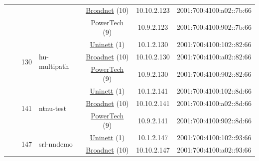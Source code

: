 \begin{small}
\begin{center}
\begin{longtable}{|c|c|c|c|c|c|c|c|}
  &  &  &  & \multicolumn{2}{|c|}{\tiny{\href{https://www.broadnet.no}{Broadnet} (10)}} & \tiny{10.10.2.123} & \tiny{2001:700:4100:a02::7b:66} \\* \cline{5-5}\cline{6-6}\cline{7-7}\cline{8-8}
  &  &  &  & \multicolumn{2}{|c|}{\tiny{\href{http://www.powertech.no}{PowerTech} (9)}} & \tiny{10.9.2.123} & \tiny{2001:700:4100:902::7b:66} \\* \cline{3-3}\cline{4-4}\cline{5-5}\cline{6-6}\cline{7-7}\cline{8-8}
  &  & \multirow{3}{*}{\tiny{130}} & \multicolumn{1}{|l|}{\multirow{3}{*}{\tiny{hu-multipath}}} & \multicolumn{2}{|c|}{\tiny{\href{https://www.uninett.no}{Uninett} (1)}} & \tiny{10.1.2.130} & \tiny{2001:700:4100:102::82:66} \\* \cline{5-5}\cline{6-6}\cline{7-7}\cline{8-8}
  &  &  &  & \multicolumn{2}{|c|}{\tiny{\href{https://www.broadnet.no}{Broadnet} (10)}} & \tiny{10.10.2.130} & \tiny{2001:700:4100:a02::82:66} \\* \cline{5-5}\cline{6-6}\cline{7-7}\cline{8-8}
  &  &  &  & \multicolumn{2}{|c|}{\tiny{\href{http://www.powertech.no}{PowerTech} (9)}} & \tiny{10.9.2.130} & \tiny{2001:700:4100:902::82:66} \\* \cline{3-3}\cline{4-4}\cline{5-5}\cline{6-6}\cline{7-7}\cline{8-8}
  &  & \multirow{3}{*}{\tiny{141}} & \multicolumn{1}{|l|}{\multirow{3}{*}{\tiny{ntnu-test}}} & \multicolumn{2}{|c|}{\tiny{\href{https://www.uninett.no}{Uninett} (1)}} & \tiny{10.1.2.141} & \tiny{2001:700:4100:102::8d:66} \\* \cline{5-5}\cline{6-6}\cline{7-7}\cline{8-8}
  &  &  &  & \multicolumn{2}{|c|}{\tiny{\href{https://www.broadnet.no}{Broadnet} (10)}} & \tiny{10.10.2.141} & \tiny{2001:700:4100:a02::8d:66} \\* \cline{5-5}\cline{6-6}\cline{7-7}\cline{8-8}
  &  &  &  & \multicolumn{2}{|c|}{\tiny{\href{http://www.powertech.no}{PowerTech} (9)}} & \tiny{10.9.2.141} & \tiny{2001:700:4100:902::8d:66} \\* \cline{3-3}\cline{4-4}\cline{5-5}\cline{6-6}\cline{7-7}\cline{8-8}
  &  & \multirow{3}{*}{\tiny{147}} & \multicolumn{1}{|l|}{\multirow{3}{*}{\tiny{srl-nndemo}}} & \multicolumn{2}{|c|}{\tiny{\href{https://www.uninett.no}{Uninett} (1)}} & \tiny{10.1.2.147} & \tiny{2001:700:4100:102::93:66} \\* \cline{5-5}\cline{6-6}\cline{7-7}\cline{8-8}
  &  &  &  & \multicolumn{2}{|c|}{\tiny{\href{https://www.broadnet.no}{Broadnet} (10)}} & \tiny{10.10.2.147} & \tiny{2001:700:4100:a02::93:66} \\* \cline{5-5}\cline{6-6}\cline{7-7}\cline{8-8}

\end{longtable}
\end{center}
\end{small}

